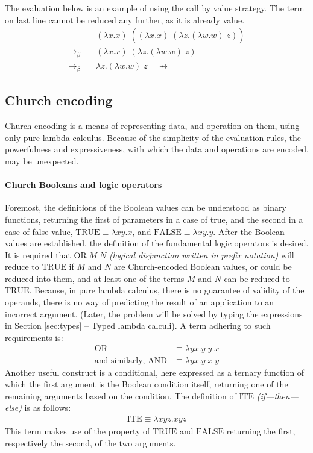 \documentclass[table, a4paper, 10pt]{book}
\begin{document}
\noindent
The evaluation below is an example of using the call
by value strategy. The term on last line cannot be reduced
any further, as it is already value.
\begin{align*}
&(\lambda x.x)\;(\underline{(\lambda x.x)\;(\lambda z.(\lambda w.w)\;z)})\\
\to_\beta\quad&\underline{(\lambda x.x)\;(\lambda z.(\lambda w.w)\;z)}\\
\to_\beta\quad&\lambda z.(\lambda w.w)\;z\;\;\;\;\not\to
\end{align*}

\subsection{Church encoding}\label{ChurchEnc}
Church encoding is a means of representing data, and operation on them, using
only pure lambda calculus. Because of the simplicity of the evaluation rules, the powerfulness
and expressiveness, with which the data and operations are encoded, may be unexpected.

\paragraph{Church Booleans and logic operators}
Foremost, the definitions of the Boolean values can be understood as binary functions, returning
the first of parameters in a case of true, and the second in a case
of false value,
$\mathrm{TRUE} \equiv \lambda xy.x$, and $\mathrm{FALSE} \equiv \lambda xy.y$.
After the Boolean values are established, the definition of the fundamental
logic operators is desired. It is required that $\mathrm{OR}\;M\;N$ 
\textit{(logical disjunction written in prefix notation)} will
reduce to $\mathrm{TRUE}$ if $M$ and $N$ are Church-encoded Boolean values,
or could be reduced into them,
and at least one of the terms $M$ and $N$ can be reduced to $\mathrm{TRUE}$.
Because, in pure lambda calculus, there is no guarantee of validity of
the operands, there is no way of predicting the result of an application to
an incorrect argument. (Later, the problem will be solved by typing
the expressions in Section \ref{sec:types} -- Typed lambda calculi). A term adhering to
such requirements is:
\begin{align*}
	\mathrm{OR} &\equiv \lambda y x. y\;y\;x\\
	\text{and similarly, }\mathrm{AND} &\equiv \lambda y x. y\;x\;y
\end{align*}
Another useful construct is a conditional, here expressed as a ternary function
of which the first argument is the Boolean condition itself, returning one
of the remaining arguments based on the condition. The definition of
$\mathrm{ITE}$ \textit{(if---then---else)} is as follows:
\begin{align*}
	\mathrm{ITE} \equiv \lambda xyz.xyz
\end{align*}
This term makes use of the property of $\mathrm{TRUE}$ and $\mathrm{FALSE}$
returning the first, respectively the second, of the two arguments.
\end{document}
